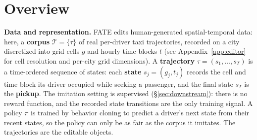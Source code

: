\section{Overview}\label{sec:overview}
\label{sec:problem}

\textbf{Data and representation.} FATE edits human-generated spatial-temporal
data: here, a \textbf{corpus} $\mathcal{T} = \{\tau\}$ of real
per-driver taxi trajectories, recorded on a city discretized into grid cells
$g$ and hourly time blocks $t$ (see Appendix~\ref{app:editor} for cell
resolution and per-city grid dimensions). A \textbf{trajectory}
$\tau = (s_1, \dots, s_T)$ is a time-ordered sequence of states: each
\textbf{state} $s_j = (g_j, t_j)$ records the cell and time block its driver
occupied while seeking a passenger, and the final state $s_T$ is the
\textbf{pickup}.
The imitation setting is supervised (\S\ref{sec:downstream}): there is no
reward function, and the recorded state transitions are the only training
signal. A policy $\pi$ is trained by behavior cloning to
predict a driver's next state from their recent states, so the policy can only
be as fair as the corpus it imitates. The trajectories are the editable
objects.

